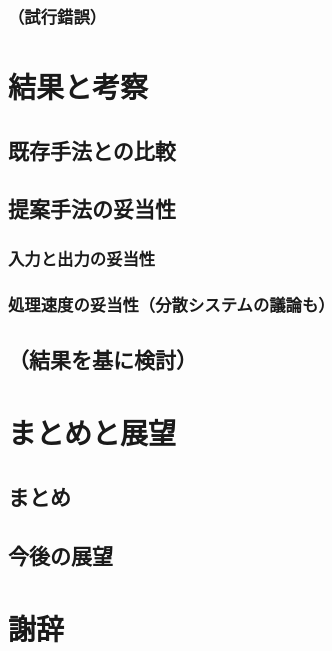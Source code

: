 \documentclass[12pt,a4j]{jreport}
\begin{document}
    \subsection{（試行錯誤）}


\chapter{結果と考察}

\section{既存手法との比較}
\section{提案手法の妥当性}
    \subsection{入力と出力の妥当性}
    \subsection{処理速度の妥当性（分散システムの議論も）}
    \section{（結果を基に検討）}


\chapter{まとめと展望}

\section{まとめ}
\section{今後の展望}


\chapter*{謝辞}




\end{document}
